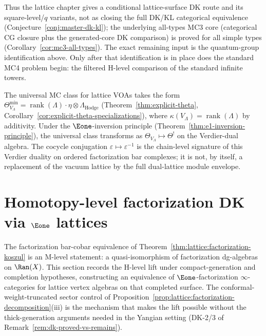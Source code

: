 \begin{remark}
Thus the lattice chapter gives a conditional
lattice-surface DK route and its square-level/$q$ variants, not as
closing the full DK/KL categorical equivalence
(Conjecture~\ref{conj:master-dk-kl}); the underlying all-types MC3 core
\textup{(}categorical CG closure plus the generated-core DK comparison\textup{)}
is proved for all simple types
\textup{(}Corollary~\ref{cor:mc3-all-types}\textup{)}. The exact remaining input
is the quantum-group identification above. Only after that identification is in
place does the standard MC4 problem begin: the filtered H-level
comparison of the standard infinite towers.

The universal MC class for lattice VOAs takes the form
$\Theta_{V_\Lambda}^{\min} = \operatorname{rank}(\Lambda) \cdot
\eta \otimes \Lambda_{\mathrm{Hodge}}$
(Theorem~\ref{thm:explicit-theta},
Corollary~\ref{cor:explicit-theta-specializations}),
where $\kappa(V_\Lambda) = \operatorname{rank}(\Lambda)$ by
additivity. Under the $\Eone$-inversion principle
(Theorem~\ref{thm:e1-inversion-principle}), the universal class
transforms as
$\Theta_{V_\Lambda} \mapsto \Theta^!$ on the Verdier-dual algebra.
The cocycle conjugation
$\varepsilon \mapsto \varepsilon^{-1}$ is the chain-level
signature of this Verdier duality on ordered factorization bar
complexes; it is not, by itself, a replacement of the vacuum lattice
by the full dual-lattice module envelope.
\end{remark}



\section{Homotopy-level factorization DK via $\Eone$ lattices}
\label{sec:lattice:homotopy-factorization-dk}


The factorization bar-cobar equivalence of
Theorem~\ref{thm:lattice:factorization-koszul} is an M-level statement:
a quasi-isomorphism of factorization dg-algebras on $\Ran(X)$. This
section records the H-level lift under compact-generation and
completion hypotheses, constructing an equivalence of
$\Eone$-factorization $\infty$-categories for lattice vertex algebras
on that completed surface.
The conformal-weight-truncated sector control of
Proposition~\ref{prop:lattice:factorization-decomposition}(iii) is the
mechanism that makes the lift possible without the thick-generation
arguments needed in the Yangian setting (DK-2/3 of
Remark~\ref{rem:dk-proved-vs-remains}).


